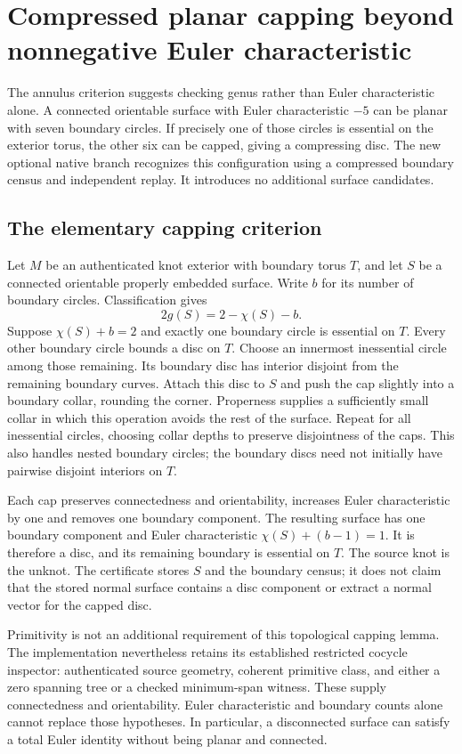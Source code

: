 \section{Compressed planar capping beyond nonnegative Euler characteristic}
\label{sec:cocycle-planar}

The annulus criterion suggests checking genus rather than Euler
characteristic alone. A connected orientable surface with Euler
characteristic $-5$ can be planar with seven boundary circles. If precisely
one of those circles is essential on the exterior torus, the other six can
be capped, giving a compressing disc. The new optional native branch
recognizes this configuration using a compressed boundary census and
independent replay. It introduces no additional surface candidates.

\subsection{The elementary capping criterion}

Let $M$ be an authenticated knot exterior with boundary torus $T$, and let
$S$ be a connected orientable properly embedded surface. Write $b$ for its
number of boundary circles. Classification gives
\[
 2g(S)=2-\chi(S)-b.
\]
Suppose $\chi(S)+b=2$ and exactly one boundary circle is essential on $T$.
Every other boundary circle bounds a disc on $T$. Choose an innermost
inessential circle among those remaining. Its boundary disc has interior
disjoint from the remaining boundary curves. Attach this disc to $S$ and
push the cap slightly into a boundary collar, rounding the corner.
Properness supplies a sufficiently small collar in which this operation
avoids the rest of the surface. Repeat for all inessential circles,
choosing collar depths to preserve disjointness of the caps. This also
handles nested boundary circles; the boundary discs need not initially
have pairwise disjoint interiors on $T$.

Each cap preserves connectedness and orientability, increases Euler
characteristic by one and removes one boundary component. The resulting
surface has one boundary component and Euler characteristic
$\chi(S)+(b-1)=1$. It is therefore a disc, and its remaining boundary is
essential on $T$. The source knot is the unknot. The certificate stores
$S$ and the boundary census; it does not claim that the stored normal
surface contains a disc component or extract a normal vector for the
capped disc.

Primitivity is not an additional requirement of this topological capping
lemma. The implementation nevertheless retains its established restricted
cocycle inspector: authenticated source geometry, coherent primitive class,
and either a zero spanning tree or a checked minimum-span witness. These
supply connectedness and orientability. Euler characteristic and boundary
counts alone cannot replace those hypotheses. In particular, a disconnected
surface can satisfy a total Euler identity without being planar and
connected.

